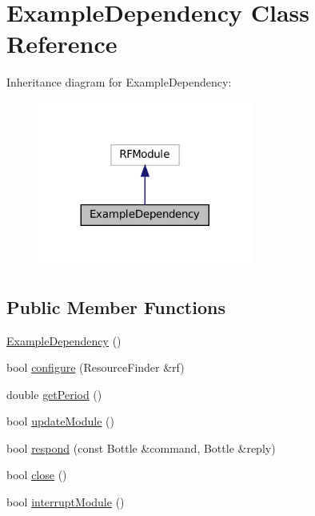 \hypertarget{classExampleDependency}{}\section{Example\+Dependency Class Reference}
\label{classExampleDependency}


Inheritance diagram for Example\+Dependency\+:
\nopagebreak
\begin{figure}[H]
\begin{center}
\leavevmode
\includegraphics[width=200pt]{classExampleDependency__inherit__graph}
\end{center}
\end{figure}
\subsection*{Public Member Functions}
\begin{DoxyCompactItemize}
\item 
\hyperlink{classExampleDependency_ae60df3258084dbc786b21cda98f9071b}{Example\+Dependency} ()
\item 
bool \hyperlink{classExampleDependency_afd7e24b5d37608b778471541df1517f4}{configure} (Resource\+Finder \&rf)
\item 
double \hyperlink{classExampleDependency_ad037fa1bf8a79f61c00ef7473ff0afed}{get\+Period} ()
\item 
bool \hyperlink{classExampleDependency_a9f360c6aef8a3ed125e9e39588f3dd63}{update\+Module} ()
\item 
bool \hyperlink{classExampleDependency_a3203a6f3036bb65a84dde233a0c693bb}{respond} (const Bottle \&command, Bottle \&reply)
\item 
bool \hyperlink{classExampleDependency_ad084c43e05a088043b80e9ff08de5984}{close} ()
\item 
bool \hyperlink{classExampleDependency_ae9f132b1492a0e4643a6043e73aa6b72}{interrupt\+Module} ()
\end{DoxyCompactItemize}


